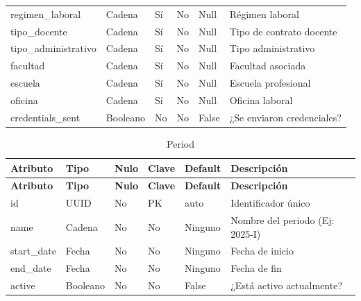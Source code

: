 \documentclass{article}
\begin{document}
\begin{longtable}{|l|l|l|l|l|l|}
regimen\_laboral & Cadena & Sí & No & Null & Régimen laboral \\
tipo\_docente & Cadena & Sí & No & Null & Tipo de contrato docente \\
tipo\_administrativo & Cadena & Sí & No & Null & Tipo administrativo \\
facultad & Cadena & Sí & No & Null & Facultad asociada \\
escuela & Cadena & Sí & No & Null & Escuela profesional \\
oficina & Cadena & Sí & No & Null & Oficina laboral \\
credentials\_sent & Booleano & No & No & False & ¿Se enviaron credenciales? \\
\hline
\end{longtable}

\begin{longtable}{|l|l|l|l|l|l|}
\caption{Period} \\
\hline
\rowcolor{tabledictionariesbackground}
\textbf{Atributo} & \textbf{Tipo} & \textbf{Nulo} & \textbf{Clave} & \textbf{Default} & \textbf{Descripción} \\
\hline
\endfirsthead
\hline
\rowcolor{tabledictionariesbackground}
\textbf{Atributo} & \textbf{Tipo} & \textbf{Nulo} & \textbf{Clave} & \textbf{Default} & \textbf{Descripción} \\
\hline
\endhead
id & UUID & No & PK & auto & Identificador único \\
name & Cadena & No & No & Ninguno & Nombre del periodo (Ej: 2025-I) \\
start\_date & Fecha & No & No & Ninguno & Fecha de inicio \\
end\_date & Fecha & No & No & Ninguno & Fecha de fin \\
active & Booleano & No & No & False & ¿Está activo actualmente? \\
\hline
\end{longtable}
\end{document}
